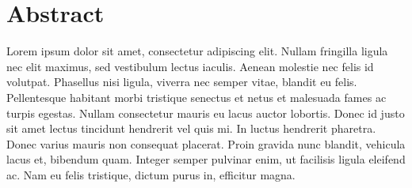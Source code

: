 \chapter*{Abstract}

Lorem ipsum dolor sit amet, consectetur adipiscing elit. Nullam fringilla ligula nec elit maximus, sed vestibulum lectus iaculis. Aenean molestie nec felis id volutpat. Phasellus nisi ligula, viverra nec semper vitae, blandit eu felis. Pellentesque habitant morbi tristique senectus et netus et malesuada fames ac turpis egestas. Nullam consectetur mauris eu lacus auctor lobortis. Donec id justo sit amet lectus tincidunt hendrerit vel quis mi. In luctus hendrerit pharetra. Donec varius mauris non consequat placerat. Proin gravida nunc blandit, vehicula lacus et, bibendum quam. Integer semper pulvinar enim, ut facilisis ligula eleifend ac. Nam eu felis tristique, dictum purus in, efficitur magna.
